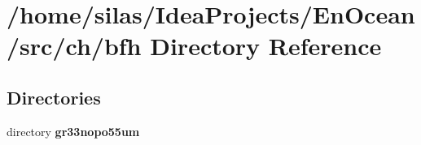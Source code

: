 \section{/home/silas/\+Idea\+Projects/\+En\+Ocean/src/ch/bfh Directory Reference}
\label{dir_634607ab8888dabf660396de0b72787e}
\subsection*{Directories}
\begin{DoxyCompactItemize}
\item 
directory {\bf gr33nopo55um}
\end{DoxyCompactItemize}
